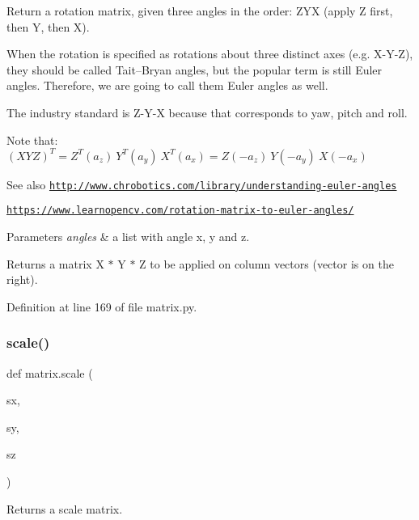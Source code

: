 Return a rotation matrix, given three angles in the order\+: Z\+YX (apply Z first, then Y, then X). 

When the rotation is specified as rotations about three distinct axes (e.\+g. X-\/\+Y-\/Z), they should be called Tait–\+Bryan angles, but the popular term is still Euler angles. Therefore, we are going to call them Euler angles as well.

The industry standard is Z-\/\+Y-\/X because that corresponds to yaw, pitch and roll.

Note that\+: $(XYZ)^T = Z^T(a_z)\ Y^T(a_y)\ X^T(a_x) = Z(-a_z)\ Y(-a_y)\ X(-a_x)$

\begin{DoxySeeAlso}{See also}
\href{http://www.chrobotics.com/library/understanding-euler-angles}{\tt http\+://www.\+chrobotics.\+com/library/understanding-\/euler-\/angles} 

\href{https://www.learnopencv.com/rotation-matrix-to-euler-angles/}{\tt https\+://www.\+learnopencv.\+com/rotation-\/matrix-\/to-\/euler-\/angles/} 
\end{DoxySeeAlso}

\begin{DoxyParams}{Parameters}
{\em angles} & a list with angle x, y and z. \\
\hline
\end{DoxyParams}
\begin{DoxyReturn}{Returns}
a matrix X $\ast$ Y $\ast$ Z to be applied on column vectors (vector is on the right). 
\end{DoxyReturn}


Definition at line 169 of file matrix.\+py.

\mbox{\label{namespacematrix_a3809ea999967baf83175d262fe553d2d}} 
\subsubsection{\texorpdfstring{scale()}{scale()}}
{\footnotesize\ttfamily def matrix.\+scale (\begin{DoxyParamCaption}\item[{}]{sx,  }\item[{}]{sy,  }\item[{}]{sz }\end{DoxyParamCaption})}



Returns a scale matrix. 


